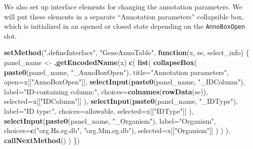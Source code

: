 \documentclass[
]{book}
\newenvironment{Shaded}{\begin{snugshade}}{\end{snugshade}}
\newcommand{\ControlFlowTok}[1]{\textcolor[rgb]{0.13,0.29,0.53}{\textbf{#1}}}
\newcommand{\DataTypeTok}[1]{\textcolor[rgb]{0.13,0.29,0.53}{#1}}
\newcommand{\KeywordTok}[1]{\textcolor[rgb]{0.13,0.29,0.53}{\textbf{#1}}}
\newcommand{\NormalTok}[1]{#1}
\newcommand{\StringTok}[1]{\textcolor[rgb]{0.31,0.60,0.02}{#1}}
\begin{document}
We also set up interface elements for changing the annotation parameters.
We will put these elements in a separate ``Annotation parameters'' collapsible box,
which is initialized in an opened or closed state depending on the \texttt{AnnoBoxOpen} slot.

\begin{Shaded}
\begin{Highlighting}[]
\KeywordTok{setMethod}\NormalTok{(}\StringTok{".defineInterface"}\NormalTok{, }\StringTok{"GeneAnnoTable"}\NormalTok{, }\ControlFlowTok{function}\NormalTok{(x, se, select_info) \{}
\NormalTok{    panel_name <-}\StringTok{ }\KeywordTok{.getEncodedName}\NormalTok{(x)}
    \KeywordTok{c}\NormalTok{(}
        \KeywordTok{list}\NormalTok{(}
            \KeywordTok{collapseBox}\NormalTok{(}
                \KeywordTok{paste0}\NormalTok{(panel_name, }\StringTok{"_AnnoBoxOpen"}\NormalTok{),}
                \DataTypeTok{title=}\StringTok{"Annotation parameters"}\NormalTok{,}
                \DataTypeTok{open=}\NormalTok{x[[}\StringTok{"AnnoBoxOpen"}\NormalTok{]],}
                \KeywordTok{selectInput}\NormalTok{(}\KeywordTok{paste0}\NormalTok{(panel_name, }\StringTok{"_IDColumn"}\NormalTok{),}
                    \DataTypeTok{label=}\StringTok{"ID-containing column:"}\NormalTok{,}
                    \DataTypeTok{choices=}\KeywordTok{colnames}\NormalTok{(}\KeywordTok{rowData}\NormalTok{(se)), }
                    \DataTypeTok{selected=}\NormalTok{x[[}\StringTok{"IDColumn"}\NormalTok{]]}
\NormalTok{                ),}
                \KeywordTok{selectInput}\NormalTok{(}\KeywordTok{paste0}\NormalTok{(panel_name, }\StringTok{"_IDType"}\NormalTok{),}
                    \DataTypeTok{label=}\StringTok{"ID type:"}\NormalTok{,}
                    \DataTypeTok{choices=}\NormalTok{allowable,}
                    \DataTypeTok{selected=}\NormalTok{x[[}\StringTok{"IDType"}\NormalTok{]]}
\NormalTok{                ),}
                \KeywordTok{selectInput}\NormalTok{(}\KeywordTok{paste0}\NormalTok{(panel_name, }\StringTok{"_Organism"}\NormalTok{),}
                    \DataTypeTok{label=}\StringTok{"Organism"}\NormalTok{,}
                    \DataTypeTok{choices=}\KeywordTok{c}\NormalTok{(}\StringTok{"org.Hs.eg.db"}\NormalTok{, }\StringTok{"org.Mm.eg.db"}\NormalTok{),}
                    \DataTypeTok{selected=}\NormalTok{x[[}\StringTok{"Organism"}\NormalTok{]]}
\NormalTok{                )}
\NormalTok{            )}
\NormalTok{        ),}
        \KeywordTok{callNextMethod}\NormalTok{()}
\NormalTok{    ) }
\NormalTok{\})}
\end{Highlighting}
\end{Shaded}
\end{document}
